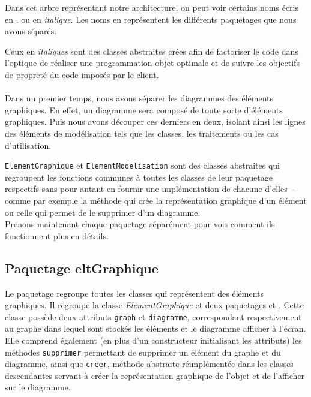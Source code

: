 \documentclass[12pt,a4paper,openany]{report}
\begin{document}
		Dans cet arbre représentant notre architecture, on peut voir certains noms écris en . 
		ou en \textit{italique}. 
		Les noms en  représentent les différents paquetages que nous avons séparés.
		
		Ceux en \textit{italiques} sont des classes abstraites crées afin de factoriser le code dans l'optique de réaliser une programmation objet optimale 
		et de suivre les objectifs de propreté du code imposés par le client.\vspace{2px}
	\paragraph{}	
		Dans un premier temps, nous avons séparer les diagrammes des éléments graphiques. En effet, un diagramme sera composé de
		toute sorte d'éléments graphiques. Puis nous avons découper ces derniers en deux, isolant ainsi les lignes des éléments
		de modélisation tels que les classes, les traitements ou les cas d'utilisation.\vspace{2px}
		
		\texttt{ElementGraphique} et \texttt{ElementModelisation} sont des classes abstraites qui regroupent les fonctions communes
		à toutes les classes de leur paquetage respectifs sans pour autant en fournir une implémentation de chacune d'elles -- comme par exemple la méthode qui crée la
		représentation graphique d'un élément ou celle qui permet de le supprimer d'un diagramme.\\ 
	Prenons maintenant chaque paquetage séparément pour vois comment ils fonctionnent plus en détails.
	\subsection{Paquetage eltGraphique}
	Le paquetage  regroupe toutes les classes qui représentent des éléments graphiques. Il regroupe la classe 
	\textit{ElementGraphique} et deux paquetages  et . Cette classe possède deux attributs 
	\texttt{graph} et \texttt{diagramme}, correspondant respectivement au graphe dans lequel sont stockés les éléments 
	et le diagramme afficher à l'écran. Elle comprend également (en plus d'un constructeur initialisant les attributs) 
	les méthodes \texttt{supprimer} permettant de supprimer un élément du graphe et du diagramme, ainsi que \texttt{creer}, 
	méthode abstraite réimplémentée dans les classes descendantes servant à créer la représentation graphique de l'objet 
	et de l'afficher sur le diagramme.
\end{document}
